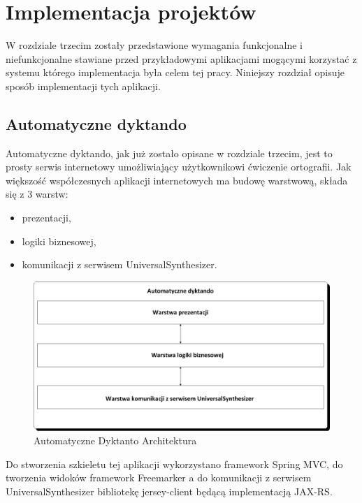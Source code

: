 
\chapter{Implementacja projektów} %



\ifpdf
    \graphicspath{{5/figures/PNG/}{5/figures/PDF/}{5/figures/}}
\else
    \graphicspath{{5/figures/EPS/}{5/figures/}}
\fi



W rozdziale trzecim zostały przedstawione wymagania funkcjonalne i niefunkcjonalne stawiane przed przykładowymi aplikacjami mogącymi korzystać z systemu którego implementacja była celem tej pracy. Niniejszy rozdział opisuje sposób implementacji tych aplikacji.
\section{Automatyczne dyktando}
Automatyczne dyktando, jak już zostało opisane w rozdziale trzecim, jest to prosty serwis internetowy umożliwiający użytkownikowi ćwiczenie ortografii. Jak większość współczesnych aplikacji internetowych ma budowę warstwową, składa się z 3 warstw:
\begin{itemize}
	\item prezentacji,
	\item logiki biznesowej,
	\item komunikacji z serwisem UniversalSynthesizer.
\end{itemize}
\begin{figure}[!h]
	\centering
	\includegraphics[scale=0.45]{automatyczneDyktandoArchitektura.png} 
	\caption{Automatyczne Dyktanto Architektura}
\end{figure}
Do stworzenia szkieletu tej aplikacji wykorzystano framework Spring MVC, do tworzenia widoków framework Freemarker a do komunikacji z serwisem UniversalSynthesizer bibliotekę jersey-client będącą implementacją JAX-RS. 
\newpage
